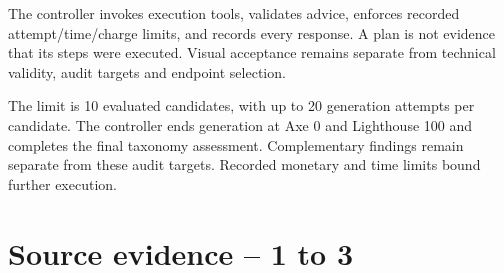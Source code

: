 \documentclass[acmsmall,screen,nonacm]{acmart}
\begin{document}
The controller invokes execution tools, validates advice, enforces recorded attempt/time/charge limits, and records every response. A plan is not evidence that its steps were executed. Visual acceptance remains separate from technical validity, audit targets and endpoint selection.

The limit is 10 evaluated candidates, with up to 20 generation attempts per candidate. The controller ends generation at Axe 0 and Lighthouse 100 and completes the final taxonomy assessment. Complementary findings remain separate from these audit targets. Recorded monetary and time limits bound further execution.

\clearpage
\section{Source evidence -- 1 to 3}
\end{document}
